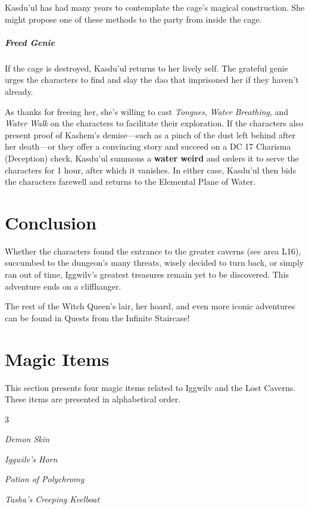 \documentclass[10pt,a4paper,twoside,bg=print,twocolumn,openany,nodeprecatedcode]{dndbook}
\begin{document}
Kasdu'ul has had many years to contemplate the cage's magical construction. She might propose one of these methods to the party from inside the cage.

\subparagraph{Freed Genie}
If the cage is destroyed, Kasdu'ul returns to her lively self. The grateful genie urges the characters to find and slay the dao that imprisoned her if they haven't already.

As thanks for freeing her, she's willing to cast \textit{Tongues}, \textit{Water Breathing}, and \textit{Water Walk} on the characters to facilitate their exploration. If the characters also present proof of Kashem's demise—such as a pinch of the dust left behind after her death—or they offer a convincing story and succeed on a DC 17 Charisma (Deception) check, Kasdu'ul summons a \textbf{water weird} and orders it to serve the characters for 1 hour, after which it vanishes. In either case, Kasdu'ul then bids the characters farewell and returns to the Elemental Plane of Water.

\section{Conclusion}
Whether the characters found the entrance to the greater caverns (see area L16), succumbed to the dungeon's many threats, wisely decided to turn back, or simply ran out of time, Iggwilv's greatest treasures remain yet to be discovered. This adventure ends on a cliffhanger.

The rest of the Witch Queen's lair, her hoard, and even more iconic adventures can be found in Quests from the Infinite Staircase!

\appendix
\section{Magic Items}
This section presents four magic items related to Iggwilv and the Lost Caverns. These items are presented in alphabetical order.


\begin{itemize}
\begin{multicols}{3}
\item \textit{Demon Skin}
\item \textit{Iggwilv's Horn}
\item \textit{Potion of Polychromy}
\item \textit{Tasha's Creeping Keelboat}
\end{multicols}

\end{itemize}
\end{document}
